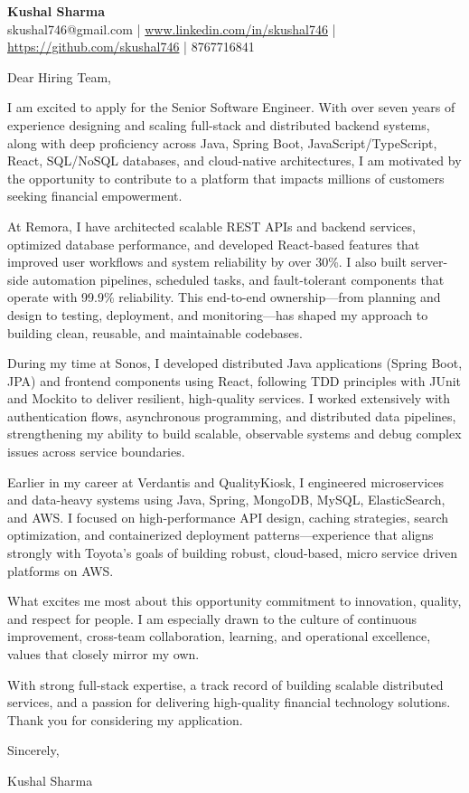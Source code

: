 \documentclass[11pt,letterpaper]{article}
\begin{document}
\begin{center}
    {\LARGE \textbf{Kushal Sharma}} \\ 
    \vspace{2pt}
    skushal746@gmail.com | \href{https://www.linkedin.com/in/skushal746}{www.linkedin.com/in/skushal746} | \href{https://github.com/skushal746}{https://github.com/skushal746} | 8767716841
\end{center}

\vspace{1.5em}

Dear Hiring Team,

I am excited to apply for the Senior Software Engineer. With over seven years of experience designing and scaling full-stack and distributed backend systems, along with deep proficiency across Java, Spring Boot, JavaScript/TypeScript, React, SQL/NoSQL databases, and cloud-native architectures, I am motivated by the opportunity to contribute to a platform that impacts millions of customers seeking financial empowerment.

At Remora, I have architected scalable REST APIs and backend services, optimized database performance, and developed React-based features that improved user workflows and system reliability by over 30\%. I also built server-side automation pipelines, scheduled tasks, and fault-tolerant components that operate with 99.9\% reliability. This end-to-end ownership—from planning and design to testing, deployment, and monitoring—has shaped my approach to building clean, reusable, and maintainable codebases.

During my time at Sonos, I developed distributed Java applications (Spring Boot, JPA) and frontend components using React, following TDD principles with JUnit and Mockito to deliver resilient, high-quality services. I worked extensively with authentication flows, asynchronous programming, and distributed data pipelines, strengthening my ability to build scalable, observable systems and debug complex issues across service boundaries.

Earlier in my career at Verdantis and QualityKiosk, I engineered microservices and data-heavy systems using Java, Spring, MongoDB, MySQL, ElasticSearch, and AWS. I focused on high-performance API design, caching strategies, search optimization, and containerized deployment patterns—experience that aligns strongly with Toyota's goals of building robust, cloud-based, micro service driven platforms on AWS.

What excites me most about this opportunity commitment to innovation, quality, and respect for people. I am especially drawn to the culture of continuous improvement, cross-team collaboration, learning, and operational excellence, values that closely mirror my own.

With strong full-stack expertise, a track record of building scalable distributed services, and a passion for delivering high-quality financial technology solutions. Thank you for considering my application.

Sincerely, 

\vspace{1em}
Kushal Sharma
\end{document}
